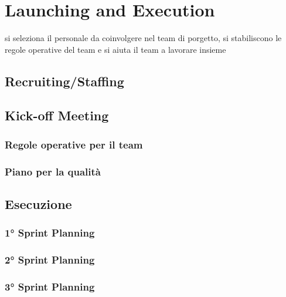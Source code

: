 \section{Launching and Execution}
si seleziona il personale da coinvolgere nel team di porgetto, si stabiliscono le regole operative del team e si aiuta il team a lavorare insieme

\subsection{Recruiting/Staffing}

\subsection{Kick-off Meeting}

\subsubsection{Regole operative per il team}

\subsubsection{Piano per la qualità}

\subsection{Esecuzione}

\subsubsection{1° Sprint Planning}

\subsubsection{2° Sprint Planning}

\subsubsection{3° Sprint Planning}